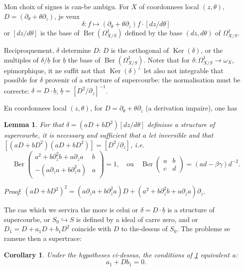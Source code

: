 \documentclass[11pt,a4paper]{article}
\theoremstyle{plain}
\newtheorem{lemma}[theorem]{Lemma}
\newtheorem{corollary}[theorem]{Corollary}
\theoremstyle{definition}
\DeclareMathOperator{\Ker}{Ker}
\DeclareMathOperator{\Ber}{Ber}
\begin{document}
Mon choix of signes is can-be ambigu. For $X$ of coordonnees local $(z,\theta)$, $D = (\partial_\theta + \theta\partial_z)$, je veux
\[
\delta : f \longmapsto (\partial_\theta + \theta\partial_z)f \cdot [dz/d\theta]
\]
or $[dz/d\theta]$ is the base of $\Ber(\Omega^1_{X/S})$ defined by the base $(dz,d\theta)$ of $\Omega^1_{X/S}$.

Reciproquement, $\delta$ determine $D$: $D$ is the orthogonal of $\Ker(\delta)$, or the multiples of $\delta/\underline{b}$ for $\underline{b}$ the base of $\Ber(\Omega^1_{X/S})$. Noter that for $\delta : \Omega^1_{X/S} \to \omega_X$, epimorphique, it ne suffit not that $\Ker(\delta)^{\perp}$ let also not integrable that possible for $\delta$ provenir of a structure of supercourbe: the normalisation must be correcte: $\delta = D \cdot \underline{b}$, $\underline{b} = [D^2/\partial_z]^{-1}$.

En coordonnees local $(z,\theta)$, for $D = \partial_\theta + \theta\partial_z$ (a derivation impaire), one has

\begin{lemma}\label{lem1.1}
For that $\delta = (aD + bD^2)[dz/d\theta]$ definisse a structure of supercourbe, it is necessary and sufficient that $a$ let inversible and that $[(aD+bD^2)(aD+bD^2)] = [D^2/\partial_z]$, i.e.
\begin{equation}\label{eq1.1.1}
\Ber\begin{pmatrix} a^2 + b\partial_z^2 b + a\partial_z a & b \\ -(a\partial_z a + b\partial_z^2 a) & a \end{pmatrix} = 1, \quad \text{ou} \quad \Ber\begin{pmatrix} a & b \\ c & d \end{pmatrix} = (ad - \beta\gamma)d^{-2}.
\end{equation}
\end{lemma}

\noindent \textit{Proof}: $(aD+bD^2)^2 = (a\partial_z a + b\partial_z^2 a)D + (a^2 + b\partial_z^2 b + a\partial_z a)\partial_z$.

The cas which we servira the more is celui or $\delta = D \cdot \underline{b}$ is a structure of supercourbe, or $S_0 \hookrightarrow S$ is defined by a ideal of carre zero, and or $D_1 = D + a_1 D + b_1 D^2$ coincide with $D$ to the-dessus of $S_0$. The probleme se ramene then a supertrace:

\newpage

\begin{corollary}\label{cor1.2}
Under the hypotheses ci-dessus, the conditions of \ref{lem1.1} equivalent a:
\begin{equation}\label{eq1.2.1}
a_1 + Db_1 = 0.
\end{equation}
\end{corollary}
\end{document}
